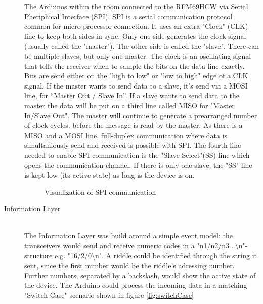 \begin{description}
          The Arduinos within the room connected to the RFM69HCW via Serial Pheriphical Interface (SPI).
          SPI is a serial communication protocol common for micro-processor connection. 
          It uses an extra "Clock" (CLK) line to keep both sides in sync. 
          Only one side generates the clock signal (usually called the "master"). The other side is called the "slave".
          There can be multiple slaves, but only one master.
          The clock is an oscillating signal that tells 
          the receiver when to sample the bits on the data line exactly. 
          Bits are send either on the "high to low" or "low to high" edge of a CLK signal.
          If the master wants to send data to a slave, it's send via a MOSI line, for “Master Out / Slave In”.
          If a slave wants to send data to the master the data will be put on a third line called MISO for "Master In/Slave Out".
          The master will continue to generate a prearranged number of clock cycles, before the message is read by the master.
          As there is a MISO and a MOSI line, full-duplex communication where data is simultaniously send and received is possible with SPI.
          The fourth line needed to enable SPI communication is the "Slave Select"(SS) line which opens the communication channel. 
          If there is only one slave, the "SS" line is kept low (its active state) as long is the device is on. 

          \begin{figure*}[h]
            \centering
            \caption{Visualization of SPI communication}
          \end{figure*}
          
	\item[Information Layer]\hfill \\
        The Information Layer was build around a simple event model: the transceivers would send and receive numeric codes in a "n1/n2/n3...\textbackslash n"-structure e.g. "16/2/0\textbackslash n". 
        A riddle could be identified through the string it sent, since the first number would be the riddle's adressing number. 
        Further numbers, separated by a backslash, would show the active state of the device. 
        The Arduino could process the incoming data in a matching "Switch-Case" scenario shown in figure \ref{fig:switchCase}


\end{description}
